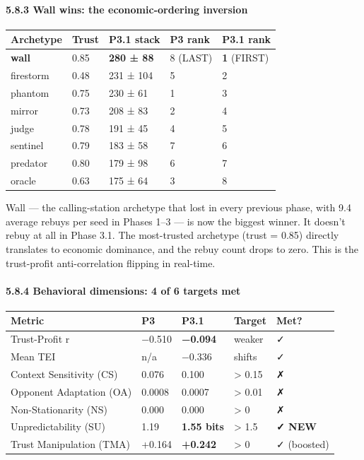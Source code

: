 \documentclass[
]{article}
\begin{document}
\hypertarget{wall-wins-the-economic-ordering-inversion}{%
\paragraph{5.8.3 Wall wins: the economic-ordering
inversion}\label{wall-wins-the-economic-ordering-inversion}}

\begin{longtable}[]{@{}lllll@{}}
\toprule\noalign{}
Archetype & Trust & P3.1 stack & P3 rank & P3.1 rank \\
\midrule\noalign{}
\endhead
\bottomrule\noalign{}
\endlastfoot
\textbf{wall} & 0.85 & \textbf{280 ± 88} & 8 (LAST) & \textbf{1}
(FIRST) \\
firestorm & 0.48 & 231 ± 104 & 5 & 2 \\
phantom & 0.75 & 230 ± 61 & 1 & 3 \\
mirror & 0.73 & 208 ± 83 & 2 & 4 \\
judge & 0.78 & 191 ± 45 & 4 & 5 \\
sentinel & 0.79 & 183 ± 58 & 7 & 6 \\
predator & 0.80 & 179 ± 98 & 6 & 7 \\
oracle & 0.63 & 175 ± 64 & 3 & 8 \\
\end{longtable}

Wall --- the calling-station archetype that lost in every previous
phase, with 9.4 average rebuys per seed in Phases 1--3 --- is now the
biggest winner. It doesn't rebuy at all in Phase 3.1. The most-trusted
archetype (trust = 0.85) directly translates to economic dominance, and
the rebuy count drops to zero. This is the trust-profit anti-correlation
flipping in real-time.

\hypertarget{behavioral-dimensions-4-of-6-targets-met}{%
\paragraph{5.8.4 Behavioral dimensions: 4 of 6 targets
met}\label{behavioral-dimensions-4-of-6-targets-met}}

\begin{longtable}[]{@{}lllll@{}}
\toprule\noalign{}
Metric & P3 & P3.1 & Target & Met? \\
\midrule\noalign{}
\endhead
\bottomrule\noalign{}
\endlastfoot
Trust-Profit r & −0.510 & \textbf{−0.094} & weaker & ✓ \\
Mean TEI & n/a & −0.336 & shifts & ✓ \\
Context Sensitivity (CS) & 0.076 & 0.100 & \textgreater{} 0.15 & ✗ \\
Opponent Adaptation (OA) & 0.0008 & 0.0007 & \textgreater{} 0.01 & ✗ \\
Non-Stationarity (NS) & 0.000 & 0.000 & \textgreater{} 0 & ✗ \\
Unpredictability (SU) & 1.19 & \textbf{1.55 bits} & \textgreater{} 1.5 &
\textbf{✓ NEW} \\
Trust Manipulation (TMA) & +0.164 & \textbf{+0.242} & \textgreater{} 0 &
✓ (boosted) \\
\end{longtable}
\end{document}
